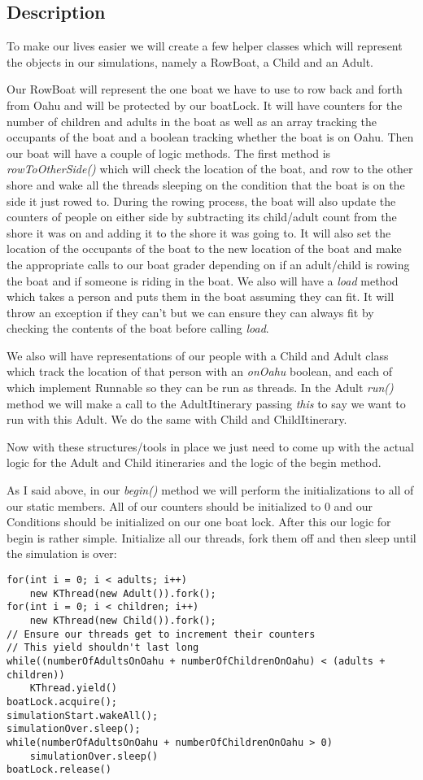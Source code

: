 \documentclass{article}
\begin{document}
\subsection*{Description}

To make our lives easier we will create a few helper classes which will represent the objects in our simulations,
namely a RowBoat, a Child and an Adult.

Our RowBoat will represent the one boat we have to use to row back and forth from Oahu and will be protected by our
boatLock. It will have counters for the number of children and adults in the boat as well as an array tracking the
occupants of the boat and a boolean tracking whether the boat is on Oahu. Then our boat will have a couple of logic
methods. The first method is \textit{rowToOtherSide()} which will check the location of the boat, and row to the other
shore and wake all the threads sleeping on the condition that the boat is on the side it just rowed to. During the
rowing process, the boat will also update the counters of people on either side by subtracting its child/adult count
from the shore it was on and adding it to the shore it was going to. It will also set the location of the occupants
of the boat to the new location of the boat and make the appropriate calls to our boat grader depending on if an
adult/child is rowing the boat and if someone is riding in the boat. We also will have a \textit{load} method
which takes a person and puts them in the boat assuming they can fit. It will throw an exception if they can't but
we can ensure they can always fit by checking the contents of the boat before calling \textit{load}.

We also will have representations of our people with a Child and Adult class which track the location of that person
with an \textit{onOahu} boolean, and each of which implement Runnable so they can be run as threads. In the Adult
\textit{run()} method we will make a call to the AdultItinerary passing \textit{this} to say we want to run with this
Adult. We do the same with Child and ChildItinerary.

Now with these structures/tools in place we just need to come up with the actual logic for the Adult and Child
itineraries and the logic of the begin method.

As I said above, in our \textit{begin()} method we will perform the initializations to all of our static members. All of
our counters should be initialized to 0 and our Conditions should be initialized on our one boat lock. After this our
logic for begin is rather simple. Initialize all our threads, fork them off and then sleep until the simulation is over:
\begin{lstlisting}
for(int i = 0; i < adults; i++)
    new KThread(new Adult()).fork();
for(int i = 0; i < children; i++)
    new KThread(new Child()).fork();
// Ensure our threads get to increment their counters
// This yield shouldn't last long
while((numberOfAdultsOnOahu + numberOfChildrenOnOahu) < (adults + children))
    KThread.yield()
boatLock.acquire();
simulationStart.wakeAll();
simulationOver.sleep();
while(numberOfAdultsOnOahu + numberOfChildrenOnOahu > 0)
    simulationOver.sleep()
boatLock.release()
\end{lstlisting}
\end{document}
